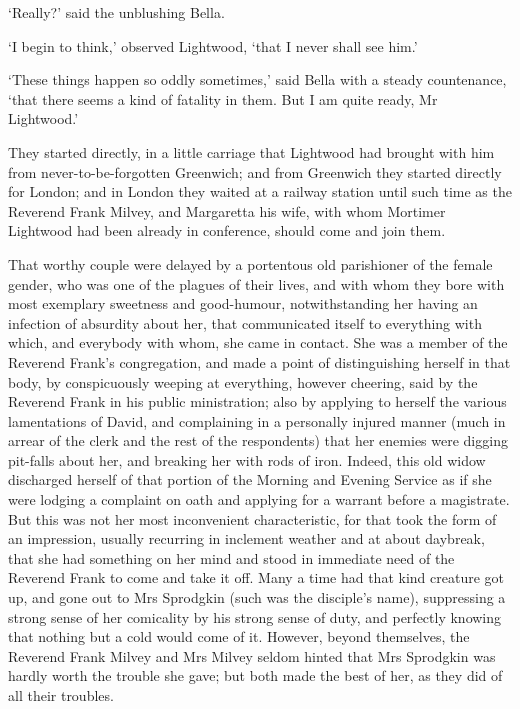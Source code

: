 ‘Really?’ said the unblushing Bella.

‘I begin to think,’ observed Lightwood, ‘that I never shall see him.’

‘These things happen so oddly sometimes,’ said Bella with a steady
countenance, ‘that there seems a kind of fatality in them. But I am
quite ready, Mr Lightwood.’

They started directly, in a little carriage that Lightwood had brought
with him from never-to-be-forgotten Greenwich; and from Greenwich they
started directly for London; and in London they waited at a railway
station until such time as the Reverend Frank Milvey, and Margaretta
his wife, with whom Mortimer Lightwood had been already in conference,
should come and join them.

That worthy couple were delayed by a portentous old parishioner of the
female gender, who was one of the plagues of their lives, and with whom
they bore with most exemplary sweetness and good-humour, notwithstanding
her having an infection of absurdity about her, that communicated itself
to everything with which, and everybody with whom, she came in contact.
She was a member of the Reverend Frank’s congregation, and made a point
of distinguishing herself in that body, by conspicuously weeping at
everything, however cheering, said by the Reverend Frank in his public
ministration; also by applying to herself the various lamentations of
David, and complaining in a personally injured manner (much in arrear of
the clerk and the rest of the respondents) that her enemies were digging
pit-falls about her, and breaking her with rods of iron. Indeed, this
old widow discharged herself of that portion of the Morning and Evening
Service as if she were lodging a complaint on oath and applying for
a warrant before a magistrate. But this was not her most inconvenient
characteristic, for that took the form of an impression, usually
recurring in inclement weather and at about daybreak, that she had
something on her mind and stood in immediate need of the Reverend Frank
to come and take it off. Many a time had that kind creature got up, and
gone out to Mrs Sprodgkin (such was the disciple’s name), suppressing
a strong sense of her comicality by his strong sense of duty, and
perfectly knowing that nothing but a cold would come of it. However,
beyond themselves, the Reverend Frank Milvey and Mrs Milvey seldom
hinted that Mrs Sprodgkin was hardly worth the trouble she gave; but
both made the best of her, as they did of all their troubles.

